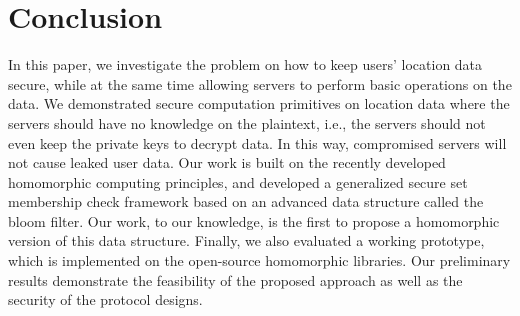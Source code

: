 \section{Conclusion}
\label{sec:conclusion}

In this paper, we investigate the problem on how to keep users' location data secure, while at the same time allowing servers to perform basic operations on the data. We demonstrated secure computation primitives on location data where the servers should have no knowledge on the plaintext, i.e., the servers should not even keep the private keys to decrypt data. In this way, compromised servers will not cause leaked user data. Our work is built on the recently developed homomorphic computing principles, and developed a generalized secure set membership check framework based on an advanced data structure called the bloom filter. Our work, to our knowledge, is the first to propose a homomorphic version of this data structure. Finally, we also evaluated a working prototype, which is implemented on the open-source homomorphic libraries. Our preliminary results demonstrate the feasibility of the proposed approach as well as the security of the protocol designs. 